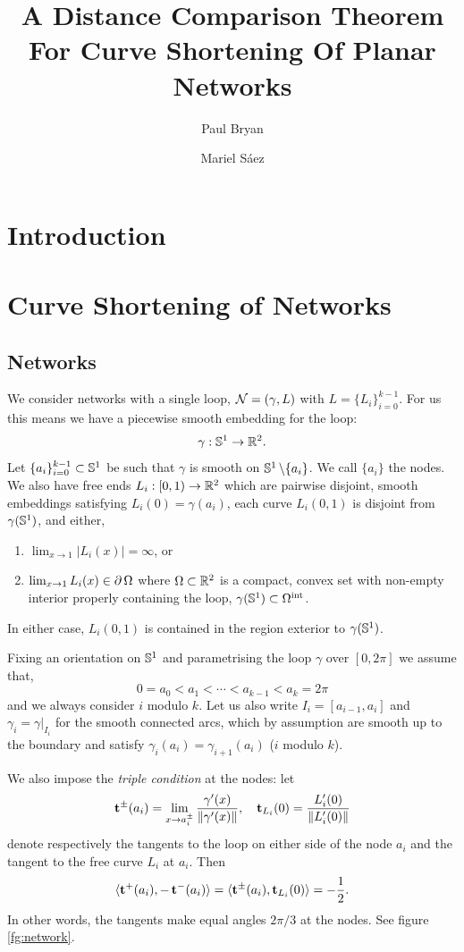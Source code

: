 \documentclass[12pt]{amsart}
\author{Paul Bryan}
\author{Mariel S\'aez}
\date{}
\title[Dist. comp. for CSF networks]{A Distance Comparison Theorem For Curve Shortening Of Planar Networks}
\begin{document}
\maketitle

\section{Introduction}
\label{sec:orgheadline1}
\section{Curve Shortening of Networks}
\label{sec:orgheadline5}

\subsection{Networks}
\label{sec:orgheadline2}

We consider networks with a single loop, \(\operatorname{\mathcal{N}} = (\gamma, L)\) with \(L = \{L_i\}_{i=0}^{k-1}\). For us this means we have a piecewise smooth embedding for the loop:
\[
\gamma : \mathbb{S}^1 \to \mathbb{R}^2.
\]
Let \(\{a_i\}_{i=0}^{k-1} \subset \mathbb{S}^{1}\) be such that \(\gamma\) is smooth on \(\mathbb{S}^1 \operatorname{\backslash} \{a_i\}\). We call \(\{a_i\}\) the nodes. We also have free ends \(L_i : [0, 1) \to \mathbb{R}^2\) which are pairwise disjoint, smooth embeddings satisfying \(L_i(0) = \gamma(a_i)\), each curve \(L_i(0, 1)\) is disjoint from \(\gamma(\mathbb{S}^1)\), and either,
\begin{enumerate}
\item \(\lim_{x\to 1} |L_i(x)| = \infty\), or
\item \(\lim_{x\to 1} L_i(x) \in \operatorname{\partial}{\Omega}\) where \(\Omega \subset \mathbb{R}^2\) is a compact, convex set with non-empty interior properly containing the loop, \(\gamma(\mathbb{S}^1) \subset {\Omega}^{\text{int}}\).
\end{enumerate}
In either case, \(L_i(0,1)\) is contained in the region exterior to \(\gamma(\mathbb{S}^1)\).

Fixing an orientation on \(\mathbb{S}^1\) and parametrising the loop \(\gamma\) over \([0, 2\pi]\) we assume that,
\[
0 = a_0 < a_1 < \cdots < a_{k-1} < a_k = 2\pi
\]
and we always consider \(i\) modulo \(k\). Let us also write \(I_i = [a_{i-1}, a_i]\) and \(\gamma_i = \gamma|_{I_i}\) for the smooth connected arcs, which by assumption are smooth up to the boundary and satisfy \(\gamma_i(a_i) = \gamma_{i+1}(a_i)\) (\(i\) modulo \(k\)).

We also impose the \emph{triple condition} at the nodes: let
\[
\operatorname{\mathbf{t}}^{\pm} (a_i) = \lim_{x\to a_i^{\pm}} \frac{\gamma'(x)}{\|\gamma'(x)\|}, \quad \operatorname{\mathbf{t}}_{L_i}(0) = \frac{L_i'(0)}{\|L_i'(0)\|}
\]
denote respectively the tangents to the loop on either side of the node \(a_i\) and the tangent to the free curve \(L_i\) at \(a_i\). Then
\begin{equation}
\label{eq:triplecondition}
\langle{\operatorname{\mathbf{t}}^+(a_i)},{-\operatorname{\mathbf{t}}^-(a_i)}\rangle = \langle{\operatorname{\mathbf{t}}^{\pm}(a_i)},{\operatorname{\mathbf{t}}_{L_i}(0)}\rangle = - \frac{1}{2}.
\end{equation}
In other words, the tangents make equal angles \(2\pi/3\) at the nodes. See figure \ref{fg:network}.
\end{document}
